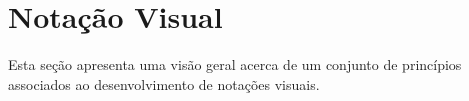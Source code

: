 \section{Notação Visual}\label{2-fundamentacao-notacao-visual}

Esta seção apresenta uma visão geral acerca de um conjunto de princípios associados ao desenvolvimento de notações visuais.


